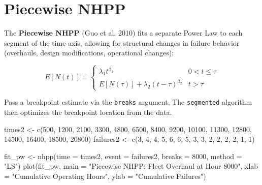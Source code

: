 \documentclass[
  letterpaper,
  DIV=11,
  numbers=noendperiod]{scrreprt}
\newenvironment{Shaded}{\begin{snugshade}}{\end{snugshade}}
\newcommand{\AttributeTok}[1]{\textcolor[rgb]{0.40,0.45,0.13}{#1}}
\newcommand{\DecValTok}[1]{\textcolor[rgb]{0.68,0.00,0.00}{#1}}
\newcommand{\FunctionTok}[1]{\textcolor[rgb]{0.28,0.35,0.67}{#1}}
\newcommand{\NormalTok}[1]{\textcolor[rgb]{0.00,0.23,0.31}{#1}}
\newcommand{\OtherTok}[1]{\textcolor[rgb]{0.00,0.23,0.31}{#1}}
\newcommand{\StringTok}[1]{\textcolor[rgb]{0.13,0.47,0.30}{#1}}
\begin{document}
\section{Piecewise NHPP}\label{piecewise-nhpp}

The \textbf{Piecewise NHPP} (Guo et al. 2010) fits a separate Power Law
to each segment of the time axis, allowing for structural changes in
failure behavior (overhauls, design modifications, operational changes):

\[E[N(t)] = \begin{cases} \lambda_1 t^{\beta_1} & 0 < t \leq \tau \\ E[N(\tau)] + \lambda_2(t-\tau)^{\beta_2} & t > \tau \end{cases}\]

Pass a breakpoint estimate via the \texttt{breaks} argument. The
\texttt{segmented} algorithm then optimizes the breakpoint location from
the data.

\begin{Shaded}
\begin{Highlighting}[]
\NormalTok{times2    }\OtherTok{\textless{}{-}} \FunctionTok{c}\NormalTok{(}\DecValTok{500}\NormalTok{, }\DecValTok{1200}\NormalTok{, }\DecValTok{2100}\NormalTok{, }\DecValTok{3300}\NormalTok{, }\DecValTok{4800}\NormalTok{, }\DecValTok{6500}\NormalTok{, }\DecValTok{8400}\NormalTok{, }\DecValTok{9200}\NormalTok{, }\DecValTok{10100}\NormalTok{, }\DecValTok{11300}\NormalTok{,}
               \DecValTok{12800}\NormalTok{, }\DecValTok{14500}\NormalTok{, }\DecValTok{16400}\NormalTok{, }\DecValTok{18500}\NormalTok{, }\DecValTok{20800}\NormalTok{)}
\NormalTok{failures2 }\OtherTok{\textless{}{-}} \FunctionTok{c}\NormalTok{(}\DecValTok{3}\NormalTok{, }\DecValTok{4}\NormalTok{, }\DecValTok{4}\NormalTok{, }\DecValTok{5}\NormalTok{, }\DecValTok{6}\NormalTok{, }\DecValTok{6}\NormalTok{, }\DecValTok{5}\NormalTok{, }\DecValTok{3}\NormalTok{, }\DecValTok{3}\NormalTok{, }\DecValTok{2}\NormalTok{, }\DecValTok{2}\NormalTok{, }\DecValTok{2}\NormalTok{, }\DecValTok{2}\NormalTok{, }\DecValTok{1}\NormalTok{, }\DecValTok{1}\NormalTok{)}

\NormalTok{fit\_pw }\OtherTok{\textless{}{-}} \FunctionTok{nhpp}\NormalTok{(}\AttributeTok{time =}\NormalTok{ times2, }\AttributeTok{event =}\NormalTok{ failures2, }\AttributeTok{breaks =} \DecValTok{8000}\NormalTok{, }\AttributeTok{method =} \StringTok{"LS"}\NormalTok{)}
\FunctionTok{plot}\NormalTok{(fit\_pw,}
     \AttributeTok{main =} \StringTok{"Piecewise NHPP: Fleet Overhaul at Hour 8000"}\NormalTok{,}
     \AttributeTok{xlab =} \StringTok{"Cumulative Operating Hours"}\NormalTok{,}
     \AttributeTok{ylab =} \StringTok{"Cumulative Failures"}\NormalTok{)}
\end{Highlighting}
\end{Shaded}
\end{document}
